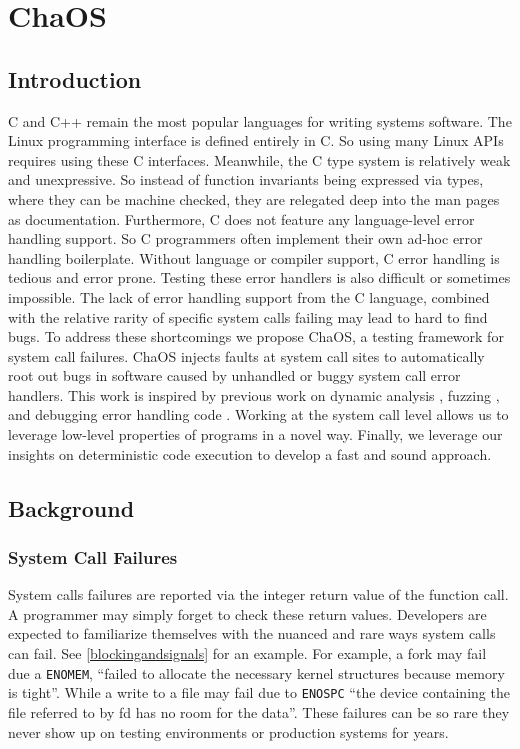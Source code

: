 \newcommand{\ldpreload}{LD\textunderscore PRELOAD}

\section{ChaOS}

\subsection{Introduction}
C and C++ remain the most popular languages for writing systems software. The Linux programming interface is defined entirely in C. So using many Linux APIs requires using these C interfaces. Meanwhile, the C type system is relatively weak and unexpressive. So instead of function invariants being expressed via types, where they can be machine checked, they are relegated deep into the man pages as documentation. Furthermore, C does not feature any language-level error handling support. So C programmers often implement their own ad-hoc error handling boilerplate. Without language or compiler support, C error handling is tedious and error prone. Testing these error handlers is also difficult or sometimes impossible. The lack of error handling support from the C language, combined with the relative rarity of specific system calls failing may lead to hard to find bugs.
To address these shortcomings we propose ChaOS, a testing framework for system call failures. ChaOS injects faults at system call sites to automatically root out bugs in software caused by unhandled or buggy system call error handlers. This work is inspired by previous work on dynamic analysis \cite{coz}, fuzzing \cite{afl, fuzz-scheduler}, and debugging error handling code \cite{fuzzing-error-handling}.
Working at the system call level allows us to leverage low-level properties of programs in a novel way. Finally, we leverage our insights on deterministic code execution to develop a fast and sound approach.

\subsection{Background}

\subsubsection{System Call Failures}

System calls failures are reported via the integer return value of the function call. A programmer may simply forget to check these return values. Developers are expected to familiarize themselves with the nuanced and rare ways system calls can fail. See \ref{blockingandsignals} for an example. For example, a fork may fail due a \texttt{ENOMEM}, ``failed to allocate the necessary kernel structures because memory is tight''. While a write to a file may fail due to \texttt{ENOSPC} ``the device containing the file referred to by fd has no room for the data''. These failures can be so rare they never show up on testing environments or production systems for years.

